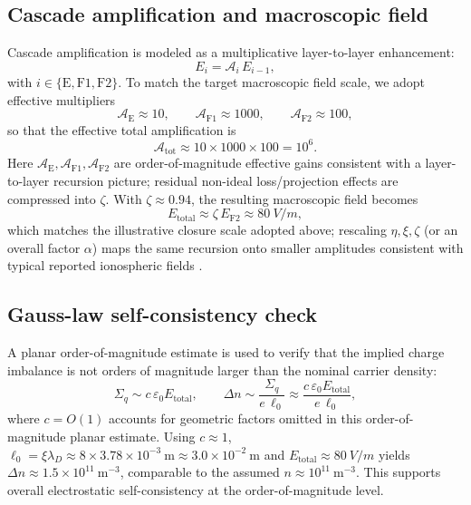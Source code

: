 \documentclass[11pt,a4paper]{article}
\begin{document}
\subsection{Cascade amplification and macroscopic field}
Cascade amplification is modeled as a multiplicative layer-to-layer enhancement:
\begin{equation}
E_i=\mathcal{A}_i\,E_{i-1},
\end{equation}
with $i\in\{\mathrm{E},\mathrm{F1},\mathrm{F2}\}$.
To match the target macroscopic field scale, we adopt effective multipliers
\begin{equation}
\mathcal{A}_{\mathrm{E}}\approx 10,\qquad
\mathcal{A}_{\mathrm{F1}}\approx 1000,\qquad
\mathcal{A}_{\mathrm{F2}}\approx 100,
\end{equation}
so that the effective total amplification is
\begin{equation}
\mathcal{A}_{\mathrm{tot}}\approx 10\times 1000\times 100 = 10^6.
\end{equation}
Here $\mathcal{A}_{\mathrm{E}},\mathcal{A}_{\mathrm{F1}},\mathcal{A}_{\mathrm{F2}}$ are order-of-magnitude effective gains consistent with a layer-to-layer recursion picture; residual non-ideal loss/projection effects are compressed into $\zeta$. With $\zeta\approx 0.94$, the resulting macroscopic field becomes
\begin{equation}
E_{\mathrm{total}}\approx \zeta\,E_{\mathrm{F2}}\approx \SI{80}{V/m},
\end{equation}
which matches the illustrative closure scale adopted above; rescaling $\eta,\xi,\zeta$ (or an overall factor $\alpha$) maps the same recursion onto smaller amplitudes consistent with typical reported ionospheric fields \cite{Kelley2009EarthIonosphere,SchunkNagy2009IonospherePhysics}.

\subsection{Gauss-law self-consistency check}
A planar order-of-magnitude estimate is used to verify that the implied charge imbalance is not orders of magnitude larger than the nominal carrier density:
\begin{equation}
\Sigma_q\sim c\,\varepsilon_0 E_{\mathrm{total}},\qquad
\Delta n \sim \frac{\Sigma_q}{e\,\ell_0}\approx \frac{c\,\varepsilon_0 E_{\mathrm{total}}}{e\,\ell_0},
\end{equation}
where $c=O(1)$ accounts for geometric factors omitted in this order-of-magnitude planar estimate. Using $c\approx 1$, $\ell_0=\xi\lambda_D\approx 8\times 3.78\times 10^{-3}~\mathrm{m}\approx 3.0\times 10^{-2}~\mathrm{m}$ and $E_{\mathrm{total}}\approx \SI{80}{V/m}$ yields $\Delta n\approx 1.5\times 10^{11}~\mathrm{m^{-3}}$, comparable to the assumed $n\approx 10^{11}~\mathrm{m^{-3}}$.
This supports overall electrostatic self-consistency at the order-of-magnitude level.
\end{document}
